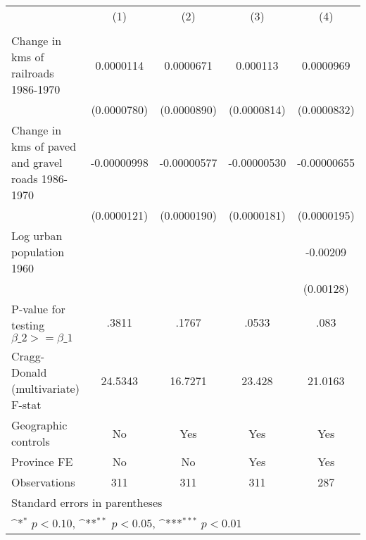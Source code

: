 {
\def\sym#1{\ifmmode^{#1}\else\(^{#1}\)\fi}
\begin{tabular}{l*{4}{c}}
\hline\hline
                &\multicolumn{1}{c}{(1)}&\multicolumn{1}{c}{(2)}&\multicolumn{1}{c}{(3)}&\multicolumn{1}{c}{(4)}\\
                &\multicolumn{1}{c}{}&\multicolumn{1}{c}{}&\multicolumn{1}{c}{}&\multicolumn{1}{c}{}\\
\hline
Change in kms of railroads 1986-1970&0.0000114         &0.0000671         & 0.000113         &0.0000969         \\
                &(0.0000780)         &(0.0000890)         &(0.0000814)         &(0.0000832)         \\
[1em]
Change in kms of paved and gravel roads 1986-1970&-0.00000998         &-0.00000577         &-0.00000530         &-0.00000655         \\
                &(0.0000121)         &(0.0000190)         &(0.0000181)         &(0.0000195)         \\
[1em]
Log urban population 1960&                  &                  &                  & -0.00209         \\
                &                  &                  &                  &(0.00128)         \\
\hline
P-value for testing $\beta\_{2} >= \beta\_{1}$&    .3811         &    .1767         &    .0533         &     .083         \\
Cragg-Donald (multivariate) F-stat&  24.5343         &  16.7271         &   23.428         &  21.0163         \\
Geographic controls&       No         &      Yes         &      Yes         &      Yes         \\
Province FE     &       No         &       No         &      Yes         &      Yes         \\
Observations    &      311         &      311         &      311         &      287         \\
\hline\hline
\multicolumn{5}{l}{\footnotesize Standard errors in parentheses}\\
\multicolumn{5}{l}{\footnotesize \sym{*} \(p<0.10\), \sym{**} \(p<0.05\), \sym{***} \(p<0.01\)}\\
\end{tabular}
}
